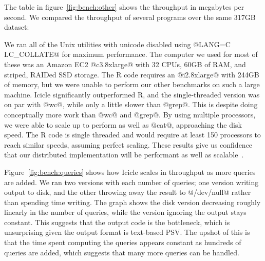 The table in figure~\ref{fig:bench:other} shows the throughput in megabytes per second.
We compared the throughput of several programs over the same 317GB dataset:

We ran all of the Unix utilities with unicode disabled using @LANG=C LC_COLLATE@ for maximum performance.
The computer we used for most of these was an Amazon EC2 @c3.8xlarge@ with 32 CPUs, 60GB of RAM, and striped, RAIDed SSD storage.
The R code requires an @i2.8xlarge@ with 244GB of memory, but we were unable to perform our other benchmarks on such a large machine.
Icicle significantly outperformed R, and the single-threaded version was on par with @wc@, while only a little slower than @grep@.
This is despite doing conceptually more work than @wc@ and @grep@.
By using multiple processors, we were able to scale up to perform as well as @cat@, approaching the disk speed.
The R code is single threaded and would require at least 150 processors to reach similar speeds, assuming perfect scaling.
These results give us confidence that our distributed implementation will be performant as well as scalable~\cite{mcsherry2015scalability}.

Figure~\ref{fig:bench:queries} shows how Icicle scales in throughput as more queries are added.
We ran two versions with each number of queries; one version writing output to disk, and the other throwing away the result to @/dev/null@ rather than spending time writing.
The graph shows the disk version decreasing roughly linearly in the number of queries, while the version ignoring the output stays constant.
This suggests that the output code is the bottleneck, which is unsurprising given the output format is text-based PSV.
The upshot of this is that the time spent computing the queries appears constant as hundreds of queries are added, which suggests that many more queries can be handled.

